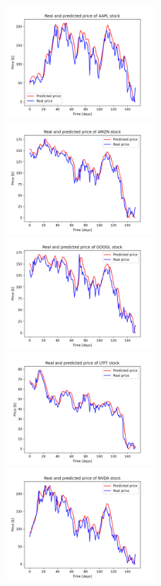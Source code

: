 \begin{figure}
\includegraphics[width=0.5\textwidth]{./graf/model9/AAPL.png}
\includegraphics[width=0.5\textwidth]{./graf/model9/AMZN.png}
\includegraphics[width=0.5\textwidth]{./graf/model9/GOOGL.png}
\includegraphics[width=0.5\textwidth]{./graf/model9/LYFT.png}
\includegraphics[width=0.5\textwidth]{./graf/model9/NVDA.png}

\end{figure}
